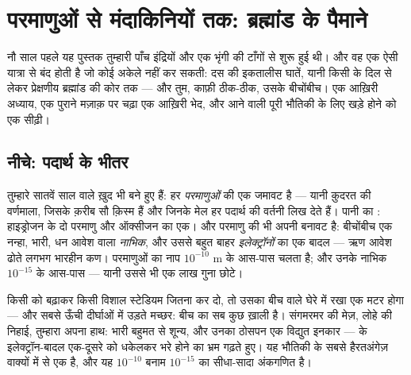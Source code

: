 \chapter{परमाणुओं से मंदाकिनियों तक: ब्रह्मांड के पैमाने}\label{ch:g9:atoms-to-galaxies}

नौ साल पहले यह पुस्तक तुम्हारी पाँच इंद्रियों और एक भृंगी की टाँगों से
शुरू हुई थी। और वह एक ऐसी यात्रा से बंद होती है जो कोई  अकेले
नहीं कर सकती: दस की इकतालीस घातें, यानी किसी  के दिल से लेकर
प्रेक्षणीय ब्रह्मांड की कोर तक --- और तुम, काफ़ी ठीक-ठीक, उसके बीचोंबीच।
एक आख़िरी अध्याय, एक पुराने मज़ाक़ पर चढ़ा एक आख़िरी भेद, और आने वाली
पूरी भौतिकी के लिए खड़े होने को एक सीढ़ी।

\section{नीचे: पदार्थ के भीतर}

\begin{definition}[परमाणु]\label{def:g9:atoms-to-galaxies:atom}
तुम्हारे सातवें साल वाले  ख़ुद भी बने हुए हैं: हर 
\emph{परमाणुओं} की एक जमावट है --- यानी क़ुदरत की
वर्णमाला, जिसके क़रीब सौ क़िस्म हैं और जिनके मेल हर पदार्थ की वर्तनी
लिख देते हैं। पानी का : हाइड्रोजन के दो परमाणु और ऑक्सीजन का एक।
और परमाणु की भी अपनी बनावट है: बीचोंबीच एक नन्हा, भारी, धन आवेश वाला
\emph{नाभिक}, और उससे बहुत बाहर
\emph{इलेक्ट्रॉनों} का एक बादल --- ऋण आवेश ढोते
लगभग भारहीन कण। परमाणुओं का नाप $10^{-10}$ \unit{m} के आस-पास चलता है;
और उनके नाभिक $10^{-15}$ के आस-पास --- यानी उससे भी एक लाख गुना छोटे।
\end{definition}

\begin{proposition}[पदार्थ ज़्यादातर ख़ालीपन है]\label{prop:g9:atoms-to-galaxies:empty}
किसी  को बढ़ाकर किसी विशाल स्टेडियम जितना कर दो, तो उसका 
बीच वाले घेरे में रखा एक मटर होगा --- और  सबसे ऊँची
दीर्घाओं में उड़ते मच्छर: बीच का सब कुछ ख़ाली है। संगमरमर की मेज़,
लोहे की निहाई, तुम्हारा अपना हाथ: भारी बहुमत से शून्य, और उनका ठोसपन
एक विद्युत इनकार ---  के इलेक्ट्रॉन-बादल एक-दूसरे को
धकेलकर भरे होने का भ्रम गढ़ते हुए। यह भौतिकी के सबसे हैरतअंगेज़ वाक्यों
में से एक है, और यह $10^{-10}$ बनाम $10^{-15}$ का सीधा-सादा अंकगणित
है।
\end{proposition}

